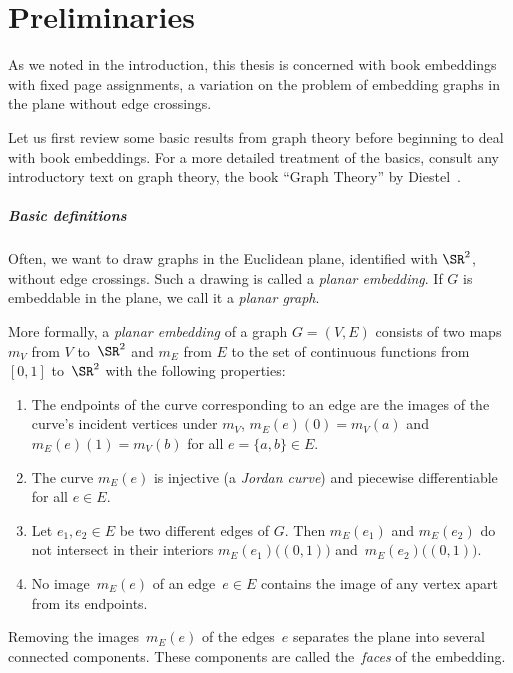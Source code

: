 \chapter{Preliminaries}\label{ch:preliminaries}

\noindent As we noted in the introduction, this thesis is concerned with book embeddings with 
fixed page assignments, a variation on the
problem of embedding graphs in the plane without edge crossings.

Let us first review some basic results from graph theory before beginning to deal with book embeddings. 
For a more detailed treatment of the basics, consult any introductory
text on graph theory, \eg the book ``Graph Theory'' by Diestel~\cite{Diestel}.

\paragraph{Basic definitions}
Often, we want to draw graphs in the Euclidean plane, identified with $\SR^2$, without
edge crossings. Such a drawing is called a \emph{planar embedding}. If $G$ is
embeddable in the plane, we call it a \emph{planar graph}.

More formally, a \emph{planar embedding} of a graph $G = (V, E)$ consists of two
maps $m_V$ from $V$ to~$\SR^2$ and $m_E$ from $E$ to the set of continuous functions from $[0, 1]$ to~$\SR^2$ with the following properties:
\begin{enumerate}
\item The endpoints of the curve corresponding to an edge are the images of the curve's incident
vertices under $m_V$, \ie $m_E(e)(0) = m_V(a)$ and $m_E(e)(1) = m_V(b)$ for
all $e = \{a, b\} \in E$.
\item The curve $m_E(e)$ is injective (a \emph{Jordan curve}) and piecewise differentiable for all $e \in E$. 
\item Let $e_1, e_2 \in E$ be two different edges of $G$. Then $m_E(e_1)$ and $m_E(e_2)$ do not
intersect in their interiors $m_E(e_1)\bigl((0, 1)\bigr)$ and~$m_E(e_2)\bigl((0, 1)\bigr)$.
\item No image~$m_E(e)$ of an edge~$e \in E$ contains the image of any vertex apart from its endpoints.
\end{enumerate}

Removing the images~$m_E(e)$ of the edges~$e$ separates the plane into several connected
components. These components are called the~\emph{faces} of the embedding.

